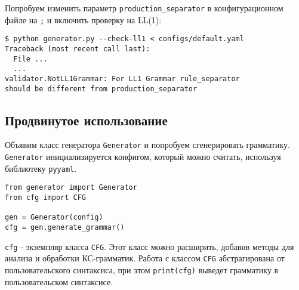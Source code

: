 \documentclass{article}
\begin{document}
Попробуем изменить параметр \verb|production_separator| в конфигурационном файле на \verb|;| и включить проверку на LL(1):

\begin{lstlisting}
$ python generator.py --check-ll1 < configs/default.yaml
Traceback (most recent call last):
  File ...
  ...
validator.NotLL1Grammar: For LL1 Grammar rule_separator
should be different from production_separator
\end{lstlisting}

\subsection{Продвинутое использование}

Объявим класс генератора \verb|Generator| и попробуем сгенерировать грамматику. \verb|Generator| инициализируется конфигом, который можно считать, используя библиотеку \verb|pyyaml|.

\begin{lstlisting}
from generator import Generator
from cfg import CFG

gen = Generator(config)
cfg = gen.generate_grammar()
\end{lstlisting}

\verb|cfg| - экземпляр класса \verb|CFG|. Этот класс можно расширить, добавив методы для анализа и обработки КС-грамматик. Работа с классом \verb|CFG| абстрагирована от пользовательского синтаксиса, при этом \verb|print(cfg)| выведет грамматику в пользовательском синтаксисе.
\end{document}
